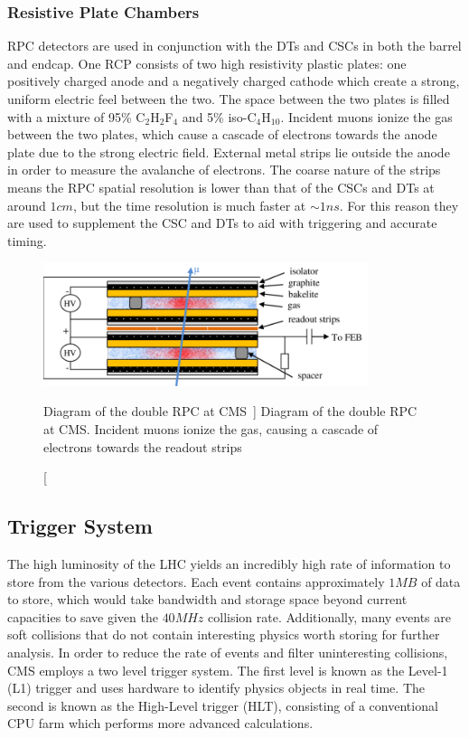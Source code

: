 \subsubsection{Resistive Plate Chambers} \label{sec:CMS_RPC}
RPC detectors are used in conjunction with the DTs and CSCs in both the barrel and endcap. One RCP consists of two high resistivity plastic plates: one positively charged anode and a negatively charged cathode which create a strong, uniform electric feel between the two. The space between the two plates is filled with a mixture of 95\% C$_2$H$_2$F$_4$ and 5\% iso-C$_4$H$_10$. Incident muons ionize the gas between the two plates, which cause a cascade of electrons towards the anode plate due to the strong electric field. External metal strips lie outside the anode in order to measure the avalanche of electrons. The coarse nature of the strips means the RPC spatial resolution is lower than that of the CSCs and DTs at around $1\unit{cm}$, but the time resolution is much faster at $\sim1\unit{ns}$. For this reason they are used to supplement the CSC and DTs to aid with triggering and accurate timing.

\begin{figure}[htpb]
	\centering
	\includegraphics[width=0.85\textwidth]{figs/03_experiment/Design1.png}
	\caption
	[Diagram of the double RPC at CMS~\cite{CMSRPC_HLLHC}]
	{Diagram of the double RPC at CMS. Incident muons ionize the gas, causing a cascade of electrons towards the readout strips~\cite{CMSRPC_HLLHC}}
	\label{fig:RPC}
\end{figure}

\subsection{Trigger System} \label{sec:CMS_trig}
The high luminosity of the LHC yields an incredibly high rate of information to store from the various detectors. Each event contains approximately $1\unit{MB}$ of data to store, which would take bandwidth and storage space beyond current capacities to save given the $40\unit{MHz}$ collision rate. Additionally, many events are soft collisions that do not contain interesting physics worth storing for further analysis. In order to reduce the rate of events and filter uninteresting collisions, CMS employs a two level trigger system. The first level is known as the Level-1 (L1) trigger and uses hardware to identify physics objects in real time. The second is known as the High-Level trigger (HLT), consisting of a conventional CPU farm which performs more advanced calculations.

